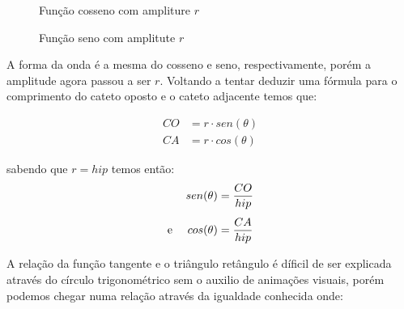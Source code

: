 \begin{multicols*}{2}
    \begin{figure}[H]
        \centering
        \caption{Função cosseno com ampliture $r$}
    \end{figure}

    \begin{figure}[H]
        \centering
        \caption{Função seno com amplitute $r$}
    \end{figure}

    A forma da onda é a mesma do cosseno e seno, respectivamente, porém a
    amplitude agora passou a ser $r$. Voltando a tentar deduzir uma fórmula para
    o comprimento do cateto oposto e o cateto adjacente temos que:

    \begin{align}
        CO & = r\cdot sen(\theta) \\
        CA & = r\cdot cos(\theta)
    \end{align}

    \noindent sabendo que $r=hip$ temos então:
    \begin{align}
        sen(\theta)                & = \frac{CO}{hip} \label{eq:eq1} \\[1ex]
        \text{e \quad} cos(\theta) & = \frac{CA}{hip} \label{eq:eq2}
    \end{align}

    A relação da função tangente e o triângulo retângulo é díficil de ser
    explicada através do círculo trigonométrico sem o auxilio de animações visuais,
    porém podemos chegar numa relação através da igualdade conhecida onde:


\end{multicols*}
